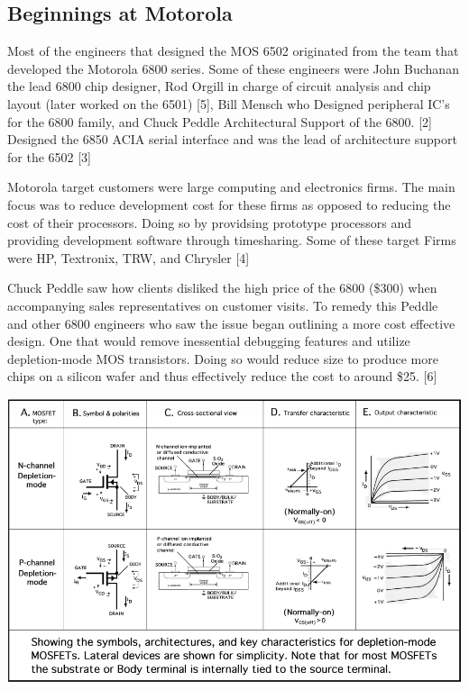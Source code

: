 \documentclass[journal]{IEEEtran}
\begin{document}
\subsection{Beginnings at Motorola}
Most of the engineers that designed the MOS 6502 originated from the team 
that developed the Motorola 6800 series.  Some of these engineers were John 
Buchanan the lead 6800 chip designer, Rod Orgill in charge of circuit analysis 
and chip layout (later worked on the 6501) [5], Bill Mensch who Designed 
peripheral IC's for the 6800 family, and Chuck Peddle Architectural Support of the 6800.
[2]  Designed the 6850 ACIA serial interface  and was the lead of architecture support 
for the 6502 [3]

Motorola target customers were large computing and electronics firms.
The main focus was to reduce development cost for these firms as opposed to 
reducing the cost of their processors.  Doing so by providsing prototype 
processors and providing development software through timesharing.  
Some of these target Firms were HP, Textronix, TRW, and Chrysler [4]

Chuck Peddle saw how clients disliked the high price of the 6800 (\$300) when 
accompanying sales representatives on customer visits. To remedy this Peddle and
other 6800 engineers who saw the issue began outlining a more cost effective design.
One that would remove inessential debugging features and utilize depletion-mode MOS 
transistors.  Doing so would reduce size to produce more chips on a silicon wafer and 
thus effectively reduce the cost to around \$25. [6]\newline

\centerline{\includegraphics[scale=0.265]{images/Depletion_Mode_Table.png}}
\end{document}
